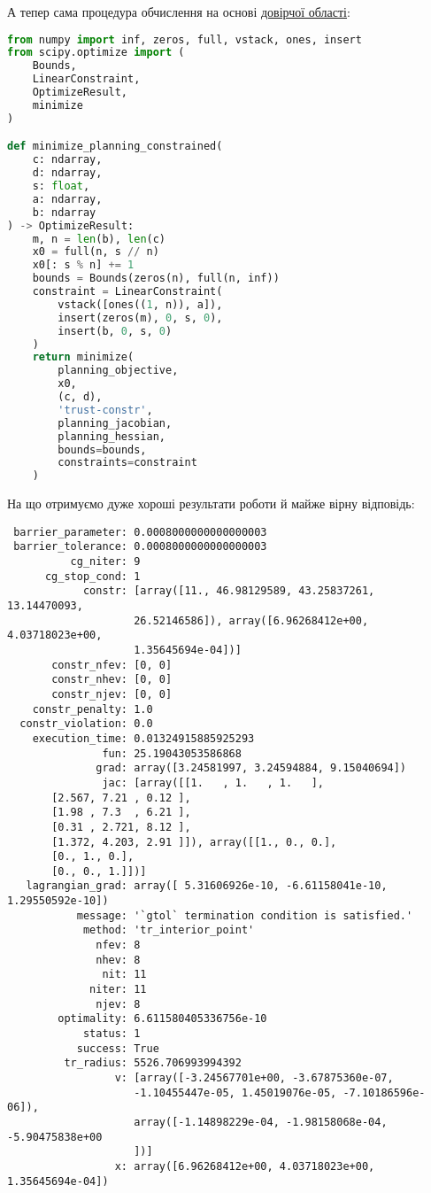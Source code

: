 \documentclass[12pt]{report}
\begin{document}
    А тепер сама процедура обчислення на основі
    \href{https://docs.scipy.org/doc/scipy/reference/optimize.minimize-trustconstr.html}{довірчої області}:

    \begin{lstlisting}[language=Python,label={lst:scipy-trust-region-2}]
from numpy import inf, zeros, full, vstack, ones, insert
from scipy.optimize import (
    Bounds,
    LinearConstraint,
    OptimizeResult,
    minimize
)

def minimize_planning_constrained(
    c: ndarray,
    d: ndarray,
    s: float,
    a: ndarray,
    b: ndarray
) -> OptimizeResult:
    m, n = len(b), len(c)
    x0 = full(n, s // n)
    x0[: s % n] += 1
    bounds = Bounds(zeros(n), full(n, inf))
    constraint = LinearConstraint(
        vstack([ones((1, n)), a]),
        insert(zeros(m), 0, s, 0),
        insert(b, 0, s, 0)
    )
    return minimize(
        planning_objective,
        x0,
        (c, d),
        'trust-constr',
        planning_jacobian,
        planning_hessian,
        bounds=bounds,
        constraints=constraint
    )
    \end{lstlisting}

    На що отримуємо дуже хороші результати роботи й майже вірну відповідь:

    \begin{verbatim}
 barrier_parameter: 0.0008000000000000003
 barrier_tolerance: 0.0008000000000000003
          cg_niter: 9
      cg_stop_cond: 1
            constr: [array([11., 46.98129589, 43.25837261, 13.14470093,
                    26.52146586]), array([6.96268412e+00, 4.03718023e+00,
                    1.35645694e-04])]
       constr_nfev: [0, 0]
       constr_nhev: [0, 0]
       constr_njev: [0, 0]
    constr_penalty: 1.0
  constr_violation: 0.0
    execution_time: 0.01324915885925293
               fun: 25.19043053586868
              grad: array([3.24581997, 3.24594884, 9.15040694])
               jac: [array([[1.   , 1.   , 1.   ],
       [2.567, 7.21 , 0.12 ],
       [1.98 , 7.3  , 6.21 ],
       [0.31 , 2.721, 8.12 ],
       [1.372, 4.203, 2.91 ]]), array([[1., 0., 0.],
       [0., 1., 0.],
       [0., 0., 1.]])]
   lagrangian_grad: array([ 5.31606926e-10, -6.61158041e-10,  1.29550592e-10])
           message: '`gtol` termination condition is satisfied.'
            method: 'tr_interior_point'
              nfev: 8
              nhev: 8
               nit: 11
             niter: 11
              njev: 8
        optimality: 6.611580405336756e-10
            status: 1
           success: True
         tr_radius: 5526.706993994392
                 v: [array([-3.24567701e+00, -3.67875360e-07,
                    -1.10455447e-05, 1.45019076e-05, -7.10186596e-06]),
                    array([-1.14898229e-04, -1.98158068e-04, -5.90475838e+00
                    ])]
                 x: array([6.96268412e+00, 4.03718023e+00, 1.35645694e-04])
    \end{verbatim}
\end{document}
